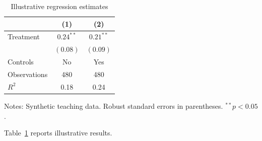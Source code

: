\documentclass[11pt]{article}
\begin{document}
\begin{table}[htbp]\centering
\begin{threeparttable}\caption{Illustrative regression estimates}\label{tab:reg}
\begin{tabular}{lcc}\toprule
& (1) & (2)\\\midrule
Treatment & $0.24^{**}$ & $0.21^{**}$\\
& $(0.08)$ & $(0.09)$\\
Controls & No & Yes\\
Observations & 480 & 480\\
$R^2$ & 0.18 & 0.24\\\bottomrule
\end{tabular}
\begin{tablenotes}\footnotesize\item Notes: Synthetic teaching data. Robust standard errors in parentheses. $^{**}p<0.05$.\end{tablenotes}
\end{threeparttable}\end{table}
Table~\ref{tab:reg} reports illustrative results.
\end{document}
